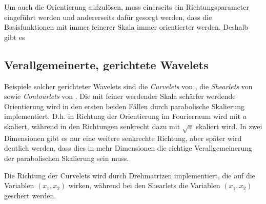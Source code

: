 Um auch die Orientierung aufzulösen, muss einerseits ein Richtungsparameter eingeführt werden und andererseits dafür gesorgt werden, dass die Basisfunktionen mit immer feinerer Skala immer orientierter werden. Deshalb gibt es


\subsection{Verallgemeinerte, gerichtete Wavelets} %
\label{sec:verallgemeinerte_gerichtete_wavelets}


 Beispiele solcher gerichteter Wavelets sind die \textit{Curvelets} von \textcite{Candes2005}, die \textit{Shearlets} von \textcite{Kutyniok2008} sowie \textit{Contourlets} von \textcite{Contourlets}. Die mit feiner werdender Skala schärfer werdende Orientierung wird in den ersten beiden Fällen durch parabolische Skalierung implementiert. D.h. in Richtung der Orientierung im Fourierraum wird mit $a$ skaliert, während in den Richtungen senkrecht dazu mit $\sqrt a$ skaliert wird. In zwei Dimensionen gibt es nur eine weitere senkrechte Richtung, aber später wird deutlich werden, dass dies in mehr Dimensionen die richtige Verallgemeinerung der parabolischen Skalierung sein muss.

 Die Richtung der Curvelets wird durch Drehmatrizen implementiert, die auf die Variablen $(x_1,x_2)$ wirken, während bei den Shearlets die Variablen $(x_1,x_2)$ geschert werden.




